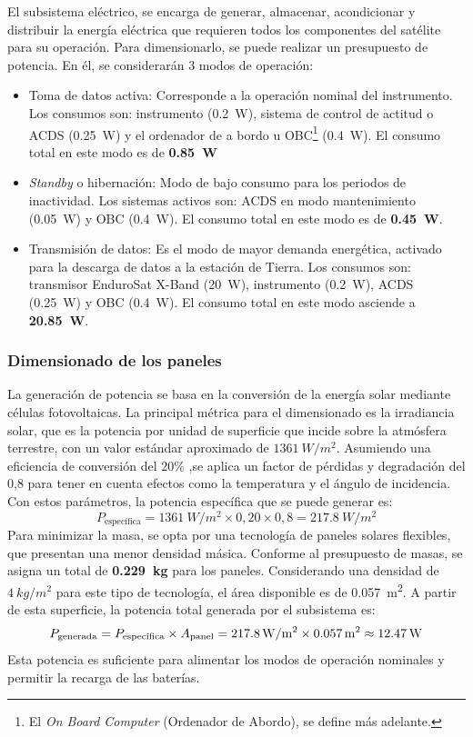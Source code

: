 El subsistema eléctrico, se encarga de generar, almacenar, acondicionar y distribuir la energía eléctrica que requieren todos los componentes del satélite para su operación. Para dimensionarlo, se puede realizar un presupuesto de potencia. En él, se considerarán 3 modos de operación:

\begin{itemize}
    \item Toma de datos activa: Corresponde a la operación nominal del instrumento. Los consumos son: instrumento (\SI{0,2}{W}), sistema de control de actitud o ACDS (\SI{0,25}{W}) y el ordenador de a bordo u OBC\footnote{El \textit{On Board Computer} (Ordenador de Abordo), se define más adelante.} (\SI{0,4}{W}). El consumo total en este modo es de \textbf{\SI{0,85}{W}}
    \item \textit{Standby} o hibernación: Modo de bajo consumo para los periodos de inactividad. Los sistemas activos son: ACDS en modo mantenimiento (\SI{0,05}{W}) y OBC (\SI{0,4}{W}). El consumo total en este modo es de \textbf{\SI{0,45}{W}}.
    \item Transmisión de datos: Es el modo de mayor demanda energética, activado para la descarga de datos a la estación de Tierra. Los consumos son: transmisor EnduroSat X-Band (\SI{20}{W}), instrumento (\SI{0,2}{W}), ACDS (\SI{0,25}{W}) y OBC (\SI{0,4}{W}). El consumo total en este modo asciende a \textbf{\SI{20,85}{W}}.
\end{itemize}

\subsubsection{Dimensionado de los paneles}

La generación de potencia se basa en la conversión de la energía solar mediante células fotovoltaicas. La principal métrica para el dimensionado es la irradiancia solar, que es la potencia por unidad de superficie que incide sobre la atmósfera terrestre, con un valor estándar aproximado de \(\SI{1361}{W/m^2}\). Asumiendo una eficiencia de conversión del 20\% ,se aplica un factor de pérdidas y degradación del 0,8 para tener en cuenta efectos como la temperatura y el ángulo de incidencia\cite{nasa2025power}. Con estos parámetros, la potencia específica que se puede generar es:
\[
P_{\text{específica}} = \SI{1361}{W/m^2} \times 0,20 \times 0,8 = \SI{217,8}{W/m^2}
\]
Para minimizar la masa, se opta por una tecnología de paneles solares flexibles, que presentan una menor densidad másica. Conforme al presupuesto de masas, se asigna un total de \textbf{\SI{0,229}{kg}} para los paneles. Considerando una densidad de \(\SI{4}{kg/m^2}\) para este tipo de tecnología, el área disponible es de \SI{0,057}{m^2}\cite{hiansa2022panel}. A partir de esta superficie, la potencia total generada por el subsistema es:
\[
P_{\text{generada}} = P_{\text{específica}} \times A_{\text{panel}} = \SI{217,8}{W/m^2} \times \SI{0,057}{m^2} \approx \textbf{\SI{12,47}{W}}
\]
Esta potencia es suficiente para alimentar los modos de operación nominales y permitir la recarga de las baterías.

